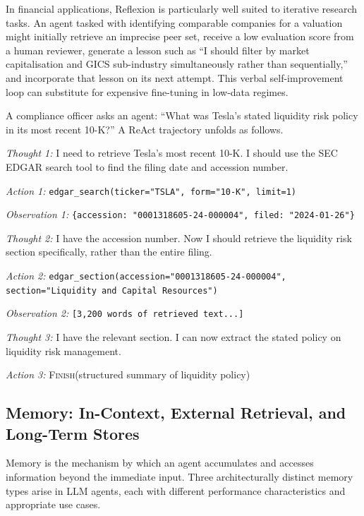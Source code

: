 \begin{deepdive}
In financial applications, Reflexion is particularly well suited to iterative research
tasks. An agent tasked with identifying comparable companies for a valuation might
initially retrieve an imprecise peer set, receive a low evaluation score from a human
reviewer, generate a lesson such as ``I should filter by market capitalisation and
GICS sub-industry simultaneously rather than sequentially,'' and incorporate that
lesson on its next attempt. This verbal self-improvement loop can substitute for
expensive fine-tuning in low-data regimes.

\begin{example}
\label{ex:react-filing}
A compliance officer asks an agent: ``What was Tesla's stated liquidity risk policy in
its most recent 10-K?'' A ReAct trajectory unfolds as follows.

\medskip
\noindent\textit{Thought 1:} I need to retrieve Tesla's most recent 10-K. I should use
the SEC EDGAR search tool to find the filing date and accession number.

\noindent\textit{Action 1:} \texttt{edgar\_search(ticker="TSLA", form="10-K", limit=1)}

\noindent\textit{Observation 1:} \texttt{\{accession: "0001318605-24-000004",
filed: "2024-01-26"\}}

\medskip
\noindent\textit{Thought 2:} I have the accession number. Now I should retrieve the
liquidity risk section specifically, rather than the entire filing.

\noindent\textit{Action 2:} \texttt{edgar\_section(accession="0001318605-24-000004",
section="Liquidity and Capital Resources")}

\noindent\textit{Observation 2:} \texttt{[3,200 words of retrieved text...]}

\medskip
\noindent\textit{Thought 3:} I have the relevant section. I can now extract the
stated policy on liquidity risk management.

\noindent\textit{Action 3:} \textsc{Finish}(structured summary of liquidity policy)
\end{example}


\subsection{Memory: In-Context, External Retrieval, and Long-Term Stores}
\label{subsec:agent-memory}

Memory is the mechanism by which an agent accumulates and accesses information beyond
the immediate input. Three architecturally distinct memory types arise in LLM agents,
each with different performance characteristics and appropriate use cases.


\end{deepdive}
